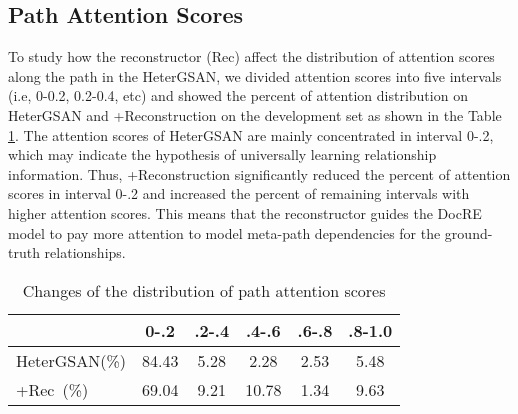 \documentclass[letterpaper]{article} \usepackage{aaai21}  \usepackage{times}  \usepackage{helvet} \usepackage{courier}  \usepackage[hyphens]{url}  \usepackage{graphicx} \urlstyle{rm} \def\UrlFont{\rm}  \usepackage{natbib}  \usepackage{caption} \frenchspacing  \setlength{\pdfpagewidth}{8.5in}  \setlength{\pdfpageheight}{11in}  \usepackage{amsmath}
\begin{document}
\subsection{Path Attention Scores}
To study how the reconstructor (Rec) affect the distribution of attention scores along the path in the HeterGSAN, we divided attention scores into five intervals (i.e, 0-0.2, 0.2-0.4, etc) and showed the percent of attention distribution on HeterGSAN and +Reconstruction on the development set as shown in the Table \ref{tab9:pathscores}.
The attention scores of HeterGSAN are mainly concentrated in interval 0-.2, which may indicate the hypothesis of universally learning relationship information. 
Thus, +Reconstruction significantly reduced the percent of attention scores in interval 0-.2 and increased the percent of remaining intervals with higher attention scores. 
This means that the reconstructor guides the DocRE model to pay more attention to model meta-path dependencies for the ground-truth relationships.
\begin{table}[h]
    \begin{center}
        \begin{tabular}{l|c|c|c|c|c}
& 0-.2& .2-.4&.4-.6& .6-.8&.8-1.0 \\ \hline
        HeterGSAN(\%)       & 84.43&5.28&2.28& 2.53& 5.48    \\
        \;\;\;\;+Rec~(\%)   & 69.04&9.21&10.78& 1.34& 9.63    \\ \end{tabular}
    \end{center}
    \caption{\label{tab9:pathscores}Changes of the distribution of path attention scores}
\end{table}
\end{document}
